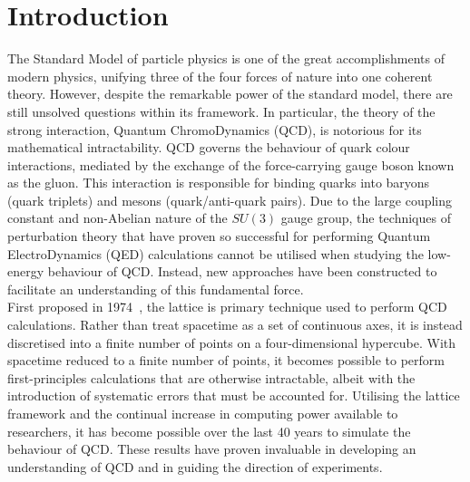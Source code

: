 
\chapter{Introduction}\label{chapter:Introduction}
\ifpdf
    \graphicspath{{Chapter1/Figs/Raster/}{Chapter1/Figs/PDF/}{Chapter1/Figs/}}
\else
    \graphicspath{{Chapter1/Figs/Vector/}{Chapter1/Figs/}}
\fi

The Standard Model of particle physics is one of the great accomplishments of modern physics, unifying three of the four forces of nature into one coherent theory. However, despite the remarkable power of the standard model, there are still unsolved questions within its framework. In particular, the theory of the strong interaction, Quantum ChromoDynamics (QCD), is notorious for its mathematical intractability. QCD governs the behaviour of quark colour interactions, mediated by the exchange of the force-carrying gauge boson known as the gluon. This interaction is responsible for binding quarks into baryons (quark triplets) and mesons (quark/anti-quark pairs). Due to the large coupling constant and non-Abelian nature of the $SU(3)$ gauge group, the techniques of perturbation theory that have proven so successful for performing Quantum ElectroDynamics (QED) calculations cannot be utilised when studying the low-energy behaviour of QCD. Instead, new approaches have been constructed to facilitate an understanding of this fundamental force.\\

First proposed in 1974~\cite{Wilson:1974sk}, the lattice is primary technique used to perform QCD calculations. Rather than treat spacetime as a set of continuous axes, it is instead discretised into a finite number of points on a four-dimensional hypercube. With spacetime reduced to a finite number of points, it becomes possible to perform first-principles calculations that are otherwise intractable, albeit with the introduction of systematic errors that must be accounted for. Utilising the lattice framework and the continual increase in computing power available to researchers, it has become possible over the last 40 years to simulate the behaviour of QCD. These results have proven invaluable in developing an understanding of QCD and in guiding the direction of experiments.\\

